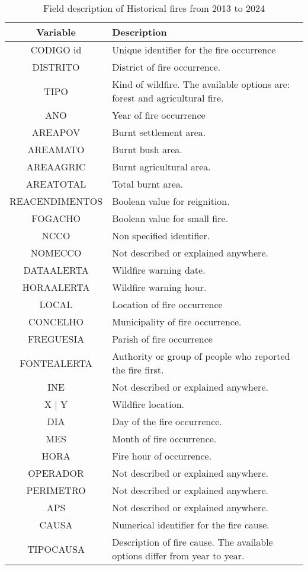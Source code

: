 \begin{table}[h!]
\caption{Field description of Historical fires from 2013 to 2024}
\label{forest_inventory}
\centering
\small
\begin{tabular}{|c|p{7.5cm}|} %
\hline
\textbf{Variable} & \textbf{Description}\\
\hline
CODIGO id  & Unique identifier for the fire occurrence \\
\hline
DISTRITO  & District of fire occurrence. \\
\hline
TIPO  & Kind of wildfire. The available options are: forest and agricultural fire.\\
\hline
ANO  & Year of fire occurrence \\
\hline
AREAPOV & Burnt settlement area. \\
\hline
AREAMATO & Burnt bush area.  \\
\hline
AREAAGRIC & Burnt agricultural area. \\
\hline
AREATOTAL & Total burnt area. \\
\hline
REACENDIMENTOS & Boolean value for reignition. \\
\hline
FOGACHO & Boolean value for small fire. \\
\hline
NCCO & Non specified identifier. \\
\hline
NOMECCO & Not described or explained anywhere. \\
\hline
DATAALERTA & Wildfire warning date. \\
\hline
HORAALERTA & Wildfire warning hour. \\
\hline
LOCAL & Location of fire occurrence \\
\hline
CONCELHO & Municipality of fire occurrence. \\
\hline
FREGUESIA & Parish of fire occurrence\\
\hline
FONTEALERTA & Authority or group of people who reported the fire first. \\
\hline
INE & Not described or explained anywhere. \\
\hline
X | Y & Wildfire location. \\
\hline
DIA & Day of the fire occurrence. \\
\hline
MES & Month of fire occurrence. \\
\hline
HORA & Fire hour of occurrence. \\
\hline
OPERADOR & Not described or explained anywhere. \\
\hline
PERIMETRO & Not described or explained anywhere. \\
\hline
APS & Not described or explained anywhere. \\
\hline
CAUSA & Numerical identifier for the fire cause. \\
\hline
TIPOCAUSA & Description of fire cause. The available options differ from year to year. \\


\end{tabular}
\end{table}
